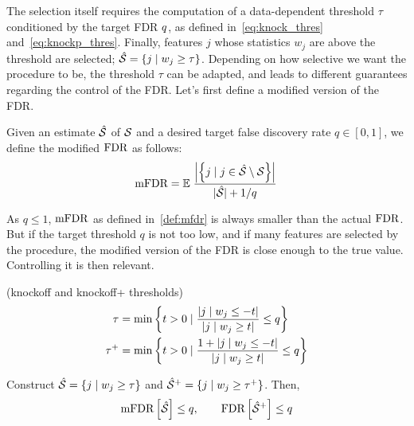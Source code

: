 The selection itself requires the computation of a data-dependent threshold $\tau$
conditioned by the target FDR $q$, as defined in~\ref{eq:knock_thres} and~\ref{eq:knockp_thres}.
Finally, features $j$ whose statistics $w_j$ are above the threshold are selected;
$\hat{\mathcal{S}} = \left\{ j \mid w_j \geq \tau \right\}$.
Depending on how selective we want the procedure to be, the threshold $\tau$ can be adapted,
and leads to different guarantees regarding the control of the FDR\@.
Let's first define a modified version of the FDR\@.
\begin{definition}\label{def:mfdr}
        Given an estimate $\hat{\mathcal{S}}$ of $\mathcal{S}$ and a desired target false discovery rate $q \in [0, 1]$,
        we define the modified $\text{FDR}$ as follows:
        \begin{equation*}
                \text{mFDR} = {\mathbb E}\left.
                \frac
                {\left\lvert\left\{ j \mid j \in \hat{\mathcal{S}} \setminus \mathcal{S} \right\}\right\rvert}
                {\lvert\hat{\mathcal{S}}\rvert + 1 / q}
                \right.
        \end{equation*}
\end{definition}
As $q \leq 1$, $\text{mFDR}$ as defined in~\ref{def:mfdr} is always smaller than the actual $\text{FDR}$.
But if the target threshold $q$ is not too low, and if many features are selected by the procedure,
the modified version of the FDR is close enough to the true value.
Controlling it is then relevant.
\begin{definition}
        (knockoff and knockoff+ thresholds)
        \begin{align}
                \tau &=
                        \min\left\{
                                t > 0 \mid \frac{\left\lvert j \mid w_j \leq -t\right\rvert}{\left\lvert j \mid w_j \geq t\right\rvert} \leq q
                        \right\}\label{eq:knock_thres}\\
                \tau^+ &=
                        \min\left\{
                                t > 0 \mid \frac{1 + \left\lvert j \mid w_j \leq -t\right\rvert}{\left\lvert j \mid w_j \geq t\right\rvert} \leq q
                        \right\}\label{eq:knockp_thres}
        \end{align}
\end{definition}

\begin{theorem}
        Construct $\hat{\mathcal{S}} = \left\{ j \mid w_j \geq \tau \right\}$
        and $\hat{\mathcal{S}}^+ = \left\{ j \mid w_j \geq \tau^+ \right\}$.
        Then,
        \begin{equation}
                \text{mFDR}\left[ \hat{\mathcal{S}} \right] \leq q
                ,\qquad
                \text{FDR}\left[ \hat{\mathcal{S}}^+ \right] \leq q
        \end{equation}
\end{theorem}
%
